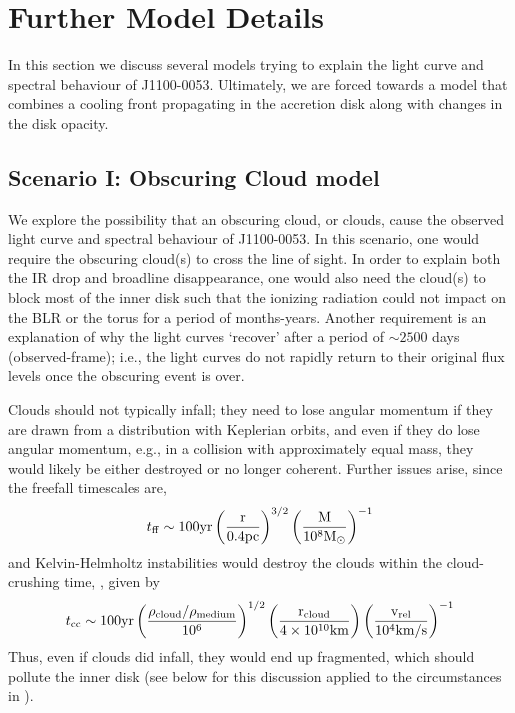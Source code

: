\documentclass[11pt,a4paper]{article}
\begin{document}
\section{Further Model Details}
In this section we discuss several models trying to explain the light
curve and spectral behaviour of J1100-0053. Ultimately, we are forced
towards a model that combines a cooling front propagating in the
accretion disk along with changes in the disk opacity.

\subsection*{Scenario I: Obscuring Cloud model}
We explore the possibility that an obscuring cloud, or clouds,
cause the observed light curve and spectral behaviour of J1100-0053.  In
this scenario, one would require the obscuring cloud(s) to cross the
line of sight. In order to explain both the IR drop and broadline
disappearance, one would also need the cloud(s) to block most of the
inner disk such that the ionizing radiation could not impact on the
BLR or the torus for a period of months-years.  Another requirement
is an explanation of why the light curves `recover' after a period of
$\sim 2500$ days (observed-frame); i.e., the light curves do not
rapidly return to their original flux levels once the obscuring event
is over.

Clouds should not typically infall; they need to lose angular momentum
if they are drawn from a distribution with Keplerian orbits, and even
if they do lose angular momentum, e.g., in a collision with
approximately equal mass, they would likely be either destroyed or no
longer coherent. Further issues 
arise, since the freefall timescales
are,
\begin{equation}
    t_{{\rm ff}}   \sim 100   \rm{yr}  \left(\frac{r}{0.4\rm{pc}}\right)^{3/2} 
                                            \left(\frac{M}{10^{8}M_{\odot}}\right)^{-1}
\end{equation}
and Kelvin-Helmholtz instabilities would destroy the clouds within the
cloud-crushing time, \citep[e.g., ][]{Nagakura2008, Hopkins2013,
Shiokawa2015, Bae2016},
given by
\begin{equation}
    t_{\rm cc} \sim 100\rm{yr} \left(\frac{\rho_{cloud}/\rho_{medium}}{10^{6}}\right)^{1/2} 
                                            \left(\frac{r_{\rm cloud}}{4 \times 10^{10}\rm{km}}\right) 
                                            \left(\frac{v_{\rm rel}}{10^{4}\rm{km/s}}\right)^{-1}
\end{equation}
Thus, even if clouds did infall, they would end up fragmented, which
should pollute the inner disk (see below for this discussion applied
to the circumstances in \citet{Guo2016}).
\end{document}
